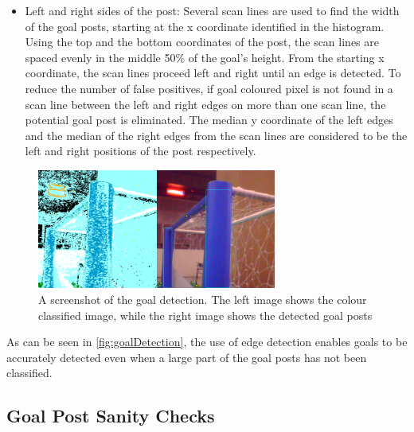 \documentclass[pdftex,11pt,a4paper]{report}
\begin{document}
\begin{itemize}
\item{Left and right sides of the post: Several scan lines are used to find the width of the goal posts, starting at the x coordinate identified in the histogram. Using the top and the bottom coordinates of the post, the scan lines are spaced evenly in the middle 50\% of the goal's height. From the starting x coordinate, the scan lines proceed left and right until an edge is detected. To reduce the number of false positives, if goal coloured pixel is not found in a scan line between the left and right edges on more than one scan line, the potential goal post is eliminated. The median y coordinate of the left edges and the median of the right edges from the scan lines are considered to be the left and right positions of the post respectively.}
\end{itemize}

\begin{figure} [t]
\centering
\includegraphics[width=0.7\textwidth]{figures/goalDetection.png}
\caption{A screenshot of the goal detection. The left image shows the colour classified image, while the right image shows the detected goal posts} \label{fig:goalDetection}
\end{figure}

As can be seen in \autoref{fig:goalDetection}, the use of edge detection enables goals to be accurately detected even when a large part of the goal posts has not been classified. 

\subsection{Goal Post Sanity Checks}
\end{document}

